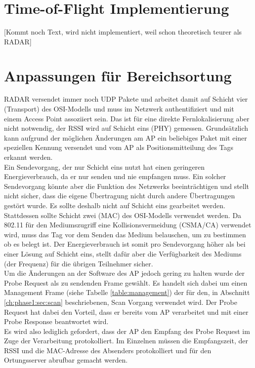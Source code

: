 \section{Time-of-Flight Implementierung}
[Kommt noch Text, wird nicht implementiert, weil schon theoretisch teurer als RADAR]

\section{Anpassungen für Bereichsortung}
\label{ch:phase2:sec:anpassungbereich}
RADAR versendet immer noch UDP Pakete und arbeitet damit auf Schicht vier (Transport) des OSI-Modells und muss im Netzwerk authentifiziert und mit einem Access Point assoziiert sein.
Das ist für eine direkte Fernlokalisierung aber nicht notwendig, der RSSI wird auf Schicht eins (PHY) gemessen.
Grundsätzlich kann aufgrund der möglichen Änderungen am AP ein beliebiges Paket mit einer speziellen Kennung versendet und vom AP als Positionsmitteilung des Tags erkannt werden. \\
Ein Sendevorgang, der nur Schicht eins nutzt hat einen geringeren Energieverbrauch, da er nur senden und nie empfangen muss.
Ein solcher Sendevorgang könnte aber die Funktion des Netzwerks beeinträchtigen und stellt nicht sicher, dass die eigene Übertragung nicht durch andere Übertragungen gestört wurde.
Es sollte deshalb nicht auf Schicht eins gearbeitet werden.\\
Stattdessen sollte Schicht zwei (MAC) des OSI-Modells verwendet werden. 
Da 802.11 für den Mediumszugriff eine Kollisionsvermeidung (CSMA/CA) verwendet wird, muss das Tag vor dem Senden das Medium belauschen, um zu bestimmen ob es belegt ist.
Der Energieverbrauch ist somit pro Sendevorgang höher als bei einer Lösung auf Schicht eins, stellt dafür aber die Verfügbarkeit des Mediums (der Frequenz) für die übrigen Teilnehmer sicher. \\
Um die Änderungen an der Software des AP jedoch gering zu halten wurde der Probe Request als zu sendenden Frame gewählt.
Es handelt sich dabei um einen Management Frame (siehe Tabelle \ref{table:management}) der für den, in Abschnitt \ref{ch:phase1:sec:scan} beschriebenen, Scan Vorgang verwendet wird.
Der Probe Request hat dabei den Vorteil, dass er bereits vom AP verarbeitet und mit einer Probe Response beantwortet wird. \\
Es wird also lediglich gefordert, dass der AP den Empfang des Probe Request im Zuge der Verarbeitung protokolliert. 
Im Einzelnen müssen die Empfangszeit, der RSSI und die MAC-Adresse des Absenders protokolliert und für den Ortungsserver abrufbar gemacht werden. 
